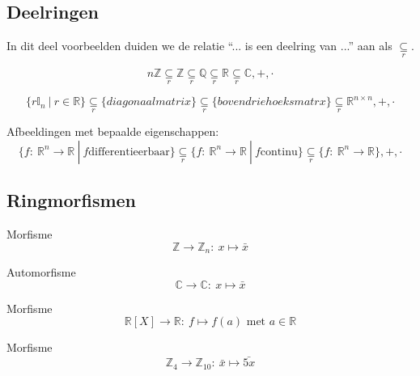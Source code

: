 \documentclass[main.tex]{subfiles}
\begin{document}
\subsection{Deelringen}
\label{sec:deelringen}

In dit deel voorbeelden duiden we de relatie ``... is een deelring van ...'' aan als $\underset{r}{\subseteq}$.

\begin{vb}
  \[ n\mathbb{Z}\underset{r}{\subseteq} \mathbb{Z} \underset{r}{\subseteq} \mathbb{Q} \underset{r}{\subseteq} \mathbb{R} \underset{r}{\subseteq} \mathbb{C},+,\cdot \]
\end{vb}

\begin{vb}
  \[ \{ r\mathbb{I}_{n} \ |\ r \in \mathbb{R} \} \underset{r}{\subseteq} \{diagonaalmatrix\} \underset{r}{\subseteq}  \{bovendriehoeksmatrx\} \underset{r}{\subseteq} \mathbb{R}^{n\times n},+,\cdot \]
\end{vb}

\begin{vb}
  Afbeeldingen met bepaalde eigenschappen:
  \[ \{ f:\ \mathbb{R}^{n} \rightarrow \mathbb{R} \ |\ f \text{differentieerbaar} \} \underset{r}{\subseteq} \{ f:\ \mathbb{R}^{n} \rightarrow \mathbb{R} \ |\ f \text{continu} \}  \underset{r}{\subseteq} \{ f:\ \mathbb{R}^{n} \rightarrow \mathbb{R} \},+,\cdot \]
\end{vb}

\subsection{Ringmorfismen}
\label{sec:ringmorfismen}

\begin{vb}
  Morfisme
  \[ \mathbb{Z} \rightarrow \mathbb{Z}_{n}:\ x \mapsto \bar{x} \]
\end{vb}

\begin{vb}
  Automorfisme
  \[ \mathbb{C} \rightarrow \mathbb{C}:\ x \mapsto \bar{x} \]
\end{vb}

\begin{vb}
  Morfisme
  \[ \mathbb{R}[X] \rightarrow \mathbb{R}:\ f \mapsto f(a) \text{ met } a \in \mathbb{R} \]
\end{vb}

\begin{vb}
  Morfisme
  \[ \mathbb{Z}_{4} \rightarrow \mathbb{Z}_{10}:\ \bar{x} \mapsto \bar{5x} \]
\end{vb}
\end{document}

